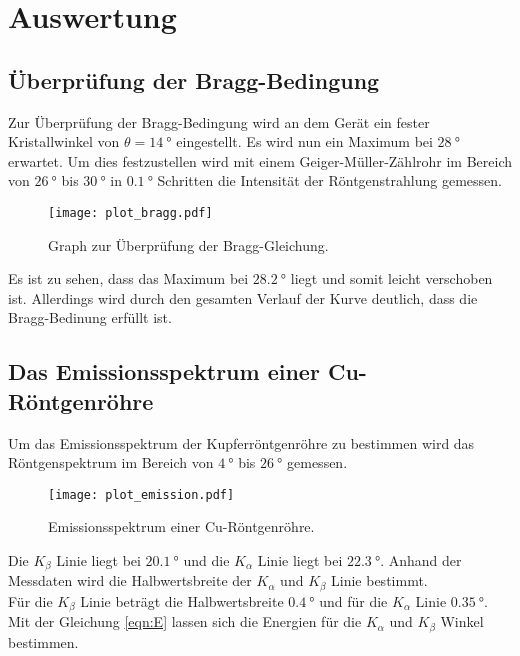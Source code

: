 \newpage
\section{Auswertung}
\label{sec:Auswertung}

\subsection{Überprüfung der Bragg-Bedingung}
Zur Überprüfung der Bragg-Bedingung wird an dem Gerät ein fester Kristallwinkel von
$\theta = \SI{14}{\degree}$ eingestellt. Es wird nun ein Maximum bei $\SI{28}{\degree}$
erwartet. Um dies festzustellen wird mit einem Geiger-Müller-Zählrohr im Bereich von
$\SI{26}{\degree}$ bis $\SI{30}{\degree}$ in $\SI{0.1}{\degree}$ Schritten die Intensität
der Röntgenstrahlung gemessen.

\begin{figure}[H]
  \centering
  \texttt{[image: plot\_bragg.pdf]}
  \caption{Graph zur Überprüfung der Bragg-Gleichung.}
  \label{fig:plot_bragg}
\end{figure}

Es ist zu sehen, dass das Maximum bei $\SI{28.2}{\degree}$ liegt und somit leicht verschoben
ist. Allerdings wird durch den gesamten Verlauf der Kurve deutlich, dass die Bragg-Bedinung
erfüllt ist.


\subsection{Das Emissionsspektrum einer Cu-Röntgenröhre}

Um das Emissionsspektrum der Kupferröntgenröhre zu bestimmen wird das Röntgenspektrum
im Bereich von $\SI{4}{\degree}$ bis $\SI{26}{\degree}$ gemessen.

\begin{figure}[H]
  \centering
  \texttt{[image: plot\_emission.pdf]}
  \caption{Emissionsspektrum einer Cu-Röntgenröhre.}
  \label{fig:plot_emission}
\end{figure}

Die $K_\beta$ Linie liegt bei $\SI{20.1}{\degree}$ und die $K_\alpha$ Linie liegt bei $\SI{22.3}{\degree}$.
Anhand der Messdaten wird die Halbwertsbreite der $K_\alpha$ und $K_\beta$ Linie bestimmt. \\
Für die $K_\beta$ Linie beträgt die Halbwertsbreite $\SI{0.4}{\degree}$ und für die
$K_\alpha$ Linie $\SI{0.35}{\degree}$.\\

Mit der Gleichung \eqref{eqn:E} lassen sich die Energien für die $K_\alpha$ und $K_\beta$
Winkel bestimmen.

